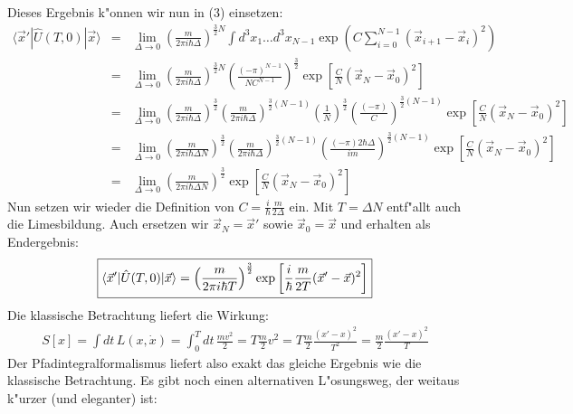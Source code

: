 \documentclass[11pt,a4paper]{article}
\begin{document}
Dieses Ergebnis k"onnen wir nun in (3) einsetzen:
\begin{eqnarray*}
\langle\vec{x}'|\hat{U}(T,0)|\vec{x}\rangle & = & \lim_{\Delta\to0} \left( \frac{m}{2\pi i\hbar\Delta}\right)^{\frac{3}{2}N}\int d^3x_1 \ldots d^3x_{N-1} \exp\left(C\sum_{i=0}^{N-1}(\vec{x}_{i+1}-\vec{x}_i)^2\right)\nonumber\\
& = & \lim_{\Delta\to0} \left( \frac{m}{2\pi i\hbar\Delta}\right)^{\frac{3}{2}N} \left( \frac{(-\pi)^{N-1}}{NC^{N-1}} \right)^\frac{3}{2} \exp\left[\frac{C}{N}(\vec{x}_N - \vec{x}_0)^2\right]\nonumber\\
& = & \lim_{\Delta\to0} \left( \frac{m}{2\pi i\hbar\Delta}\right)^{\frac{3}{2}} \left( \frac{m}{2\pi i\hbar\Delta}\right)^{\frac{3}{2}(N-1)} \left(\frac{1}{N}\right)^{\frac{3}{2}} \left( \frac{(-\pi)}{C} \right)^{\frac{3}{2}(N-1)} \exp\left[\frac{C}{N}(\vec{x}_N - \vec{x}_0)^2\right]\nonumber\\
& = & \lim_{\Delta\to0} \left( \frac{m}{2\pi i\hbar\Delta N}\right)^{\frac{3}{2}} \left( \frac{m}{2\pi i\hbar\Delta}\right)^{\frac{3}{2}(N-1)} \left( \frac{(-\pi)2\hbar\Delta}{im} \right)^{\frac{3}{2}(N-1)} \exp\left[\frac{C}{N}(\vec{x}_N - \vec{x}_0)^2\right]\\ & = & \lim_{\Delta\to0} \left( \frac{m}{2\pi i\hbar\Delta N}\right)^{\frac{3}{2}} \exp\left[\frac{C}{N}(\vec{x}_N - \vec{x}_0)^2\right]
\end{eqnarray*}
Nun setzen wir wieder die Definition von $C=\frac{i}{\hbar}\frac{m}{2\Delta}$ ein. Mit $T = \Delta N$ entf"allt auch die Limesbildung. Auch ersetzen wir $\vec{x}_N = \vec{x}'$ sowie $\vec{x}_0 = \vec{x}$ und erhalten als Endergebnis:
\begin{equation}
\fbox{$ \displaystyle
\langle\vec{x}'|\hat{U}(T,0)|\vec{x}\rangle =  \left( \frac{m}{2\pi i\hbar T}\right)^{\frac{3}{2}} \exp\left[\frac{i}{\hbar}\frac{m}{2T}(\vec{x}' - \vec{x})^2\right] $}
\end{equation}
Die klassische Betrachtung liefert die Wirkung:
\begin{eqnarray*}
S[x] = \int \! dt \, L(x,\dot{x}) = \int_0^T \! dt \, \frac{mv^2}{2} = T \frac{m}{2}v^2 = T \frac{m}{2}\frac{(x' - x)^2}{T^2} = \frac{m}{2}\frac{(x' - x)^2}{T}
\end{eqnarray*}
Der Pfadintegralformalismus liefert also exakt das gleiche Ergebnis wie die klassische Betrachtung.
\newpage
Es gibt noch einen alternativen L"osungsweg, der weitaus k"urzer (und eleganter) ist:
\end{document}
